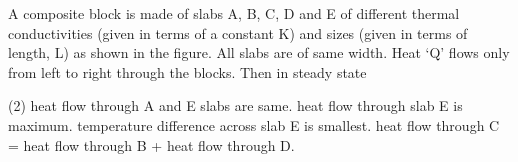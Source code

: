 
\item A composite block is made of slabs A, B, C, D and E of different thermal conductivities (given in terms of a constant K) and sizes (given in terms of length, L) as shown in the figure. All slabs are of same width. Heat `Q' flows only from left to right through the blocks. Then in steady state
    \begin{center}
    \end{center}
    \begin{tasks}(2)
        \task heat flow through A and E slabs are same.
        \task heat flow through slab E is maximum.
        \task temperature difference across slab E is smallest.
        \task heat flow through C = heat flow through B + heat flow through D.
    \end{tasks}

